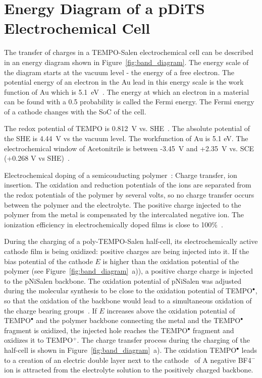 \section{Energy Diagram of a pDiTS Electrochemical Cell}
The transfer of charges in a TEMPO-Salen electrochemical cell can be described in an energy diagram shown in Figure~\ref{fig:band_diagram}. The energy scale of the diagram starts at the vacuum level - the energy of a free electron. The potential energy of an electron in the Au lead in this energy scale is the work function of Au which is 5.1~eV~\cite{Eastman1970}.  
The energy at which an electron in a material can be found with a 0.5 probability is called the Fermi energy.
The Fermi energy of a cathode changes with the SoC of the cell.

The redox potential of TEMPO is 0.812~V vs. SHE~\cite{Zhou2020}.
The absolute potential of the SHE is 4.44~V vs the vacuum level.
The workfunction of Au is 5.1 eV.
The electrochemical window of Acetonitrile is between -3.45~V and +2.35~V vs. SCE (+0.268 V vs SHE)~\cite{Luca2015}.

Electrochemical doping of a semicouducting polymer~\cite{Jacobs2022}:
Charge transfer, ion insertion.
The oxidation and reduction potentials of the ions are separated from the redox potentials of the polymer by several volts, so no charge transfer occurs between the polymer and the electrolyte. The positive charge injected to the polymer from the metal is compensated by the intercalated negative ion. The ionization efficiency in electrochemically doped films is close to 100\%~\cite{Jacobs2022}.\\
\par
During the charging of a poly-TEMPO-Salen half-cell, its electrochemically active cathode film is being oxidized: positive charges are being injected into it. If the bias potential of the cathode $E$ is higher than the oxidation potential of the polymer (see Figure~\ref{fig:band_diagram}~a)), a positive charge charge is injected to the pNiSalen backbone. The oxidation potential of pNiSalen was adjusted during the molecular synthesis to be close to the oxidation potential of TEMPO$^{\bullet}$, so that the oxidation of the backbone would lead to a simultaneous oxidation of the charge bearing groups~\cite{Vereshchagin2020}. If $E$ increases above the oxidation potential of TEMPO$^{\bullet}$ and the polymer backbone connecting the metal and the TEMPO$^{\bullet}$ fragment is oxidized, the injected hole reaches the TEMPO$^{\bullet}$ fragment and oxidizes it to TEMPO$^+$. The charge transfer process during the charging of the half-cell is shown in Figure~\ref{fig:band_diagram}~a). The oxidation TEMPO$^{\bullet}$ leads to a creation of an electric double layer next to the cathode~\cite{Bhojane2022} of A negative BF4${^-}$ ion is attracted from the electrolyte solution to the positively charged backbone.\\

